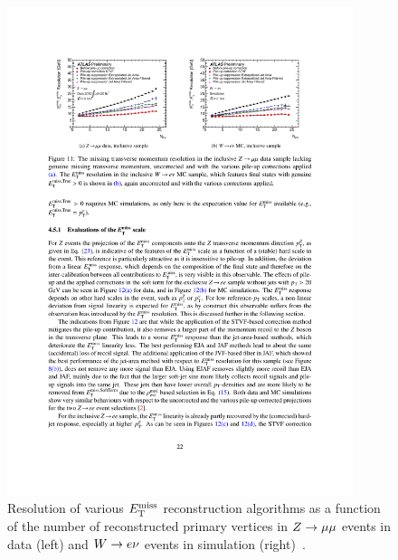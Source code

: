 \begin{figure}[tp]
  \centering
  \includegraphics[width=0.90\textwidth]{figures/performance/met-resolutionvsnpv}
  \caption{Resolution of various $E_{\mathrm{T}}^{\mathrm{miss}}$ reconstruction algorithms as a function of the number of reconstructed primary vertices in $Z \rightarrow \mu\mu$ events in data (left) and $W \rightarrow e\nu$ events in simulation (right)~\cite{ATLAS-CONF-2014-019}.}
  \label{fig:objects-met-resolution}
\end{figure}
